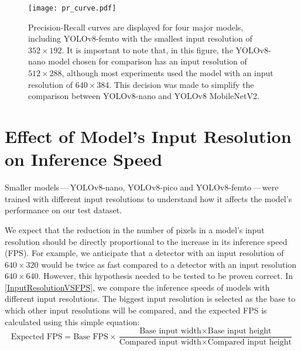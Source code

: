 \begin{figure}[H]
    \begin{framed}
        \centering
        \texttt{[image: pr\_curve.pdf]}
        \caption{Precision-Recall curves are displayed for four major models,
        including YOLOv8-femto with the smallest input resolution of $352 \times 192$. It
        is important to note that, in this figure, the YOLOv8-nano model chosen for
        comparison has an input resolution of $512 \times 288$, although most experiments
        used the model with an input resolution of $640 \times 384$. This decision was
        made to simplify the comparison between YOLOv8-nano and YOLOv8 MobileNetV2.}
        \label{PRCurveMajor}
    \end{framed}
\end{figure}






\section{Effect of Model's Input Resolution on Inference Speed}
\label{InputResolutionVSFPSExperiment}

Smaller models\,---\,YOLOv8-nano, YOLOv8-pico and YOLOv8-femto\,---\,were
trained with different input resolutions to understand how it affects the
model's performance on our test dataset.

We expect that the reduction in the number of pixels in a model's input
resolution should be directly proportional to the increase in its inference
speed (FPS). For example, we anticipate that a detector with an input resolution
of $640 \times 320$ would be twice as fast compared to a detector with an input
resolution $640 \times 640$. However, this hypothesis needed to be tested to be
proven correct. In \autoref{InputResolutionVSFPS}, we compare the inference
speeds of models with different input resolutions. The biggest input resolution
is selected as the base to which other input resolutions will be compared, and
the expected FPS is calculated using this simple equation:
\begin{equation}
    \text{Expected FPS} = \text{Base FPS} \times \frac{\text{Base input width} \times \text{Base input height}}{\text{Compared input width} \times \text{Compared input height}}
\end{equation}

